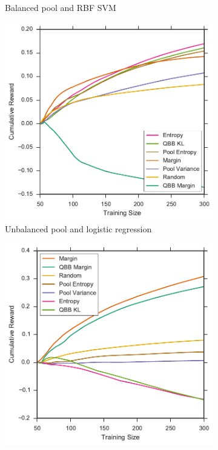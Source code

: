 \begin{figure}[p]
\begin{subfigure}{.5\textwidth}
		\caption{Balanced pool and RBF SVM}
		\label{fig:sdss_br_sum_rewards}
	\end{subfigure}
	\begin{subfigure}{.5\textwidth}
		\centering
		\includegraphics[width=\textwidth]{figures/5_thompson/sdss_ul_sum_rewards}
		\caption{Unbalanced pool and logistic regression}
		\label{fig:sdss_ul_sum_rewards}
	\end{subfigure}%
	\begin{subfigure}{.5\textwidth}
		\centering
		\includegraphics[width=\linewidth]{figures/5_thompson/sdss_ur_sum_rewards}

\end{subfigure}
\end{figure}
